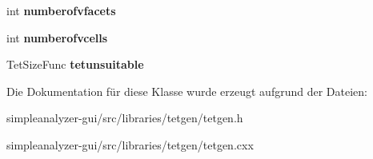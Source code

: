 \begin{DoxyCompactItemize}
\item 
\hypertarget{classtetgenio_a054e5d022a3e6c6cb490975487390bba}{int {\bfseries numberofvfacets}}\label{classtetgenio_a054e5d022a3e6c6cb490975487390bba}

\item 
\hypertarget{classtetgenio_afbc917d5c352817d0668170f71bb8404}{int {\bfseries numberofvcells}}\label{classtetgenio_afbc917d5c352817d0668170f71bb8404}

\item 
\hypertarget{classtetgenio_ad57af35c7c480da03af06b1388a4a8f7}{Tet\-Size\-Func {\bfseries tetunsuitable}}\label{classtetgenio_ad57af35c7c480da03af06b1388a4a8f7}

\end{DoxyCompactItemize}


Die Dokumentation für diese Klasse wurde erzeugt aufgrund der Dateien\-:\begin{DoxyCompactItemize}
\item 
simpleanalyzer-\/gui/src/libraries/tetgen/tetgen.\-h\item 
simpleanalyzer-\/gui/src/libraries/tetgen/tetgen.\-cxx\end{DoxyCompactItemize}
